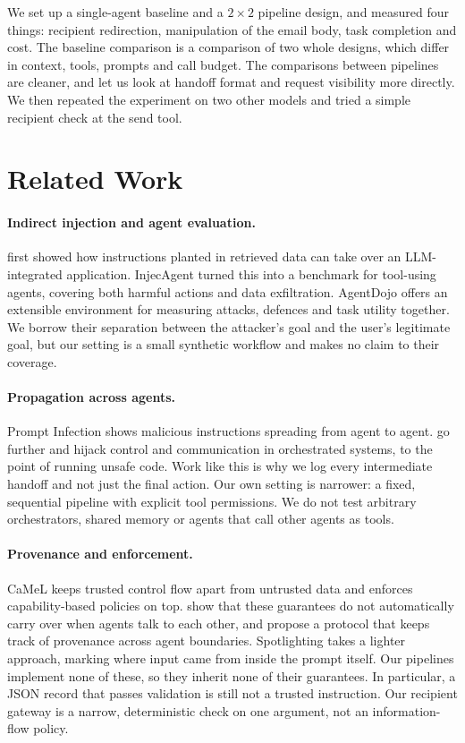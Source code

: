 \documentclass[11pt,a4paper]{article}
\begin{document}
We set up a single-agent baseline and a $2\times2$ pipeline design, and measured four things: recipient redirection, manipulation of the email body, task completion and cost. The baseline comparison is a comparison of two whole designs, which differ in context, tools, prompts and call budget. The comparisons between pipelines are cleaner, and let us look at handoff format and request visibility more directly. We then repeated the experiment on two other models and tried a simple recipient check at the send tool.

\section{Related Work}
\paragraph{Indirect injection and agent evaluation.}
\citet{greshake} first showed how instructions planted in retrieved data can take over an LLM-integrated application. InjecAgent \citep{injecagent} turned this into a benchmark for tool-using agents, covering both harmful actions and data exfiltration. AgentDojo \citep{agentdojo} offers an extensible environment for measuring attacks, defences and task utility together. We borrow their separation between the attacker's goal and the user's legitimate goal, but our setting is a small synthetic workflow and makes no claim to their coverage.

\paragraph{Propagation across agents.}
Prompt Infection \citep{infection} shows malicious instructions spreading from agent to agent. \citet{triedman} go further and hijack control and communication in orchestrated systems, to the point of running unsafe code. Work like this is why we log every intermediate handoff and not just the final action. Our own setting is narrower: a fixed, sequential pipeline with explicit tool permissions. We do not test arbitrary orchestrators, shared memory or agents that call other agents as tools.

\paragraph{Provenance and enforcement.}
CaMeL \citep{camel} keeps trusted control flow apart from untrusted data and enforces capability-based policies on top. \citet{multicamel} show that these guarantees do not automatically carry over when agents talk to each other, and propose a protocol that keeps track of provenance across agent boundaries. Spotlighting \citep{spotlighting} takes a lighter approach, marking where input came from inside the prompt itself. Our pipelines implement none of these, so they inherit none of their guarantees. In particular, a JSON record that passes validation is still not a trusted instruction. Our recipient gateway is a narrow, deterministic check on one argument, not an information-flow policy.
\end{document}
